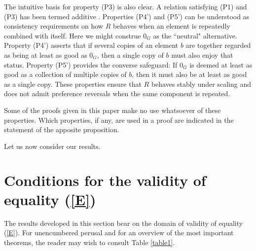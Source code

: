 \documentclass[pdflatex,sn-apa,11pt]{sn-jnl}%
\begin{document}
The intuitive basis for property (P3) is also clear. A relation satisfying (P1) and (P3) has been termed additive \citep{white1972uncertain}. Properties (P4') and (P5') can be understood as consistency requirements on how $R$ behaves when an element is repeatedly combined with itself. Here we might construe $0_G$ as the ``neutral" alternative. Property (P4') asserts that if several copies of an element $b$ 
are together regarded as being at least as good as $0_G$, then a single copy of $b$ must also enjoy that status. Property (P5') provides the converse safeguard: If $0_G$ is deemed at least as good as a collection of multiple copies of $b$, then it must also be at least as good as a single copy. These properties ensure that $R$ behaves stably 
under scaling and does not admit preference reversals when the same component is repeated.




Some of the proofs given in this paper make no use whatsoever of these properties. Which properties, if any, are used in a proof are indicated in the statement of the apposite proposition. 

Let us now consider our results.

\section{Conditions for the validity of equality (\ref{E})}\label{sec3}






The results developed in this section bear on the domain of validity of equality (\ref{E}). For unencumbered perusal and for an overview of the most important theorems, the reader may wish to consult Table \ref{table1}.
\end{document}
